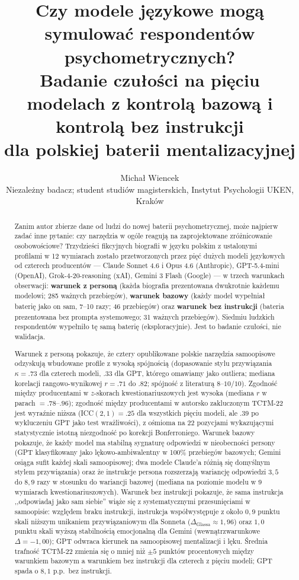 \documentclass[11pt,a4paper]{article}
\title{\textbf{Czy modele językowe mogą symulować respondentów psychometrycznych?\\[4pt]
Badanie czułości na pięciu modelach z kontrolą bazową i kontrolą bez instrukcji\\dla polskiej baterii mentalizacyjnej}}
\author{Micha{\l} Wiencek\\\small Niezależny badacz; student studiów magisterskich, Instytut Psychologii UKEN, Krak\'ow}
\date{}
\begin{document}
\maketitle

\begin{abstract}
\noindent Zanim autor zbierze dane od ludzi do nowej baterii psychometrycznej, może najpierw zadać inne pytanie: czy narzędzia w ogóle reagują na zaprojektowane zróżnicowanie osobowościowe? Trzydzieści fikcyjnych biografii w języku polskim z ustalonymi profilami w 12 wymiarach zostało przetworzonych przez pięć dużych modeli językowych od czterech producentów --- Claude Sonnet 4.6 i Opus 4.6 (Anthropic), GPT-5.4-mini (OpenAI), Grok-4-20-reasoning (xAI), Gemini 3 Flash (Google) --- w trzech warunkach obserwacji: \textbf{warunek z personą} (każda biografia prezentowana dwukrotnie każdemu modelowi; 285 ważnych przebiegów), \textbf{warunek bazowy} (każdy model wypełniał baterię jako on sam, 7--10 razy; 46 przebiegów) oraz \textbf{warunek bez instrukcji} (bateria prezentowana bez prompta systemowego; 31 ważnych przebiegów). Siedmiu ludzkich respondentów wypełniło tę samą baterię (eksploracyjnie). Jest to badanie czułości, nie walidacja.

Warunek z personą pokazuje, że cztery opublikowane polskie narzędzia samoopisowe odzyskują wbudowane profile z wysoką spójnością (dopasowanie stylu przywiązania $\kappa = .73$ dla czterech modeli, $.33$ dla GPT, którego omawiamy jako outliera; mediana korelacji rangowo-wynikowej $r = .71$ do $.82$; spójność z literaturą $8$--$10$/$10$). Zgodność między producentami w $z$-skorach kwestionariuszowych jest wysoka (mediana $r$ w parach $= .78$--$.96$); zgodność między producentami w autorsko zakluczonym TCTM-22 jest wyraźnie niższa (ICC$(2,1) = .25$ dla wszystkich pięciu modeli, ale $.39$ po wykluczeniu GPT jako test wrażliwości), z ośmioma na 22 pozycjami wykazującymi statystycznie istotną niezgodność po korekcji Bonferroniego. Warunek bazowy pokazuje, że każdy model ma stabilną sygnaturę odpowiedzi w nieobecności persony (GPT klasyfikowany jako lękowo-ambiwalentny w 100\% przebiegów bazowych; Gemini osiąga sufit każdej skali samoopisowej; dwa modele Claude'a różnią się domyślnym stylem przywiązania) oraz że instrukcje persona rozszerzają wariancję odpowiedzi $3{,}5$ do $8{,}9$ razy w stosunku do wariancji bazowej (mediana na poziomie modelu w 9 wymiarach kwestionariuszowych). Warunek bez instrukcji pokazuje, że sama instrukcja ,,odpowiadaj jako sam siebie'' wiąże się z systematycznymi przesunięciami w samoopisie: względem braku instrukcji, instrukcja współwystępuje z około $0{,}9$ punktu skali niższym unikaniem przywiązaniowym dla Sonneta ($\Delta_{\text{Glassa}} \approx 1{,}96$) oraz $1{,}0$ punktu skali wyższą stabilnością emocjonalną dla Gemini (wewnątrzwarunkowe $\Delta = -1{,}00$); GPT odwraca kierunek na samoopisowej mentalizacji i lęku. Średnia trafność TCTM-22 zmienia się o mniej niż $\pm 5$ punktów procentowych między warunkiem bazowym a warunkiem bez instrukcji dla czterech z pięciu modeli; GPT spada o $8{,}1$ p.p.\ bez instrukcji.


\end{abstract}
\end{document}
